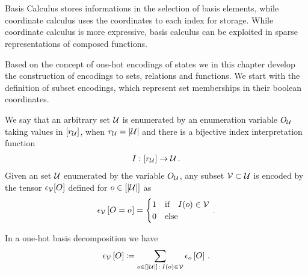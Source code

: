\chapter{\chatextbasisCalculus}\label{cha:basisCalculus}

Basis Calculus stores informations in the selection of basis elements, while coordinate calculus uses the coordinates to each index for storage.
While coordinate calculus is more expressive, basis calculus can be exploited in sparse representations of composed functions.



Based on the concept of one-hot encodings of states we in this chapter develop the construction of encodings to sets, relations and functions.
We start with the definition of subset encodings, which represent set memberships in their boolean coordinates.

\begin{definition}
    \label{def:subsetEncoding}
    We say that an arbitrary set $\mathcal{U}$ is enumerated by an enumeration variable $O_{\mathcal{U}}$ taking values in $[r_{\mathcal{U}}]$, when $r_{\mathcal{U}}=\left|\mathcal{U}\right|$ and there is a bijective index interpretation function
    \begin{align*}
        I : [r_{\mathcal{U}}] \rightarrow \mathcal{U} \, .
    \end{align*}
    Given an set $\mathcal{U}$ enumerated by the variable $O_{\mathcal{U}}$, any subset $\mathcal{V}\subset\mathcal{U}$ is encoded by the tensor $\epsilon_{\mathcal{V}}[O]$ defined for $o\in[\left|\mathcal{U}\right|]$ as
    \begin{align*}
        \epsilon_{\mathcal{V}}\left[O_{}=o_{}\right]
        = \begin{cases}
              1 & \text{if} \quad I(o) \in \mathcal{V} \\
              0 & \text{else}
        \end{cases} \, .
    \end{align*}
\end{definition}

In a one-hot basis decomposition we have
\begin{align*}
    \epsilon_{\mathcal{V}}\left[O\right]
    \coloneqq \sum_{o\in[\left|\mathcal{U}\right|]\,:\,I(o)\in\mathcal{V}}\epsilon_{o}\left[O\right] \, .
\end{align*}


